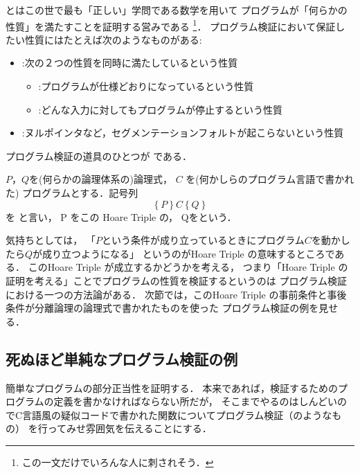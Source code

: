 \documentclass[a4paper, 10pt]{ltjsarticle}
\begin{document}
  とはこの世で最も「正しい」学問である数学を用いて
  プログラムが「何らかの性質」を満たすことを証明する営みである
  \footnote{この一文だけでいろんな人に刺されそう．}．
  プログラム検証において保証したい性質にはたとえば次のようなものがある:
  \begin{itemize}
   \item {}:次の２つの性質を同時に満たしているという性質
   \begin{itemize}
    \item {}:プログラムが仕様どおりになっているという性質
    \item {}:どんな入力に対してもプログラムが停止するという性質
   \end{itemize}   
   \item {}:ヌルポインタなど，セグメンテーションフォルトが起こらないという性質
  \end{itemize}


  プログラム検証の道具のひとつが  である．

 \begin{definition}
  $P，Q$を(何らかの論理体系の)論理式，
  $C$ を(何かしらのプログラム言語で書かれた)
  プログラムとする．記号列
  \[ \left\{P\right\} C \left\{Q\right\} \]
  を  と言い，
  P をこの Hoare Triple の，
  Qをという．
 \end{definition}

 気持ちとしては，
 「$P$という条件が成り立っているときにプログラム$C$を動かしたら$Q$が成り立つようになる」
 というのがHoare Triple の意味するところである．
 このHoare Triple が成立するかどうかを考える，
 つまり「Hoare Triple の証明を考える」ことでプログラムの性質を検証するというのは
 プログラム検証における一つの方法論がある．
 次節では，このHoare Triple の事前条件と事後条件が分離論理の論理式で書かれたものを使った
 プログラム検証の例を見せる． 
  
  \subsection{死ぬほど単純なプログラム検証の例}
  簡単なプログラムの部分正当性を証明する．
  本来であれば，検証するためのプログラムの定義を書かなければならない所だが，
  そこまでやるのはしんどいのでC言語風の疑似コードで書かれた関数についてプログラム検証（のようなもの）
  を行ってみせ雰囲気を伝えることにする．
\end{document}
